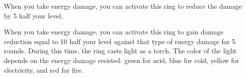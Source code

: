 \begin{comment}
\begin{dtable}
    \lcaption{Rings}
    \begin{dtabularx}{\columnwidth}{>{\lcol}X l}
        Ring & Market Price \\
        \hline
        Protection \plus1 & 2,000 gp \\
        Feather falling & 2,200 gp \\
        Climbing & 2,500 gp \\
        Jumping & 2,500 gp \\
        Sustenance & 2,500 gp \\
        Swimming & 2,500 gp \\
        Mind shielding & 8,000 gp \\
        Protection \plus2 & 8,000 gp \\
        Climbing, improved & 10,000 gp \\
        Jumping, improved & 10,000 gp \\
        Swimming, improved & 10,000 gp \\
        Energy resistance, minor & 12,000 gp \\
        Protection \plus3 & 18,000 gp \\
        Energy resistance, major & 28,000 gp \\
        Protection \plus4 & 32,000 gp \\
        Energy resistance, greater & 44,000 gp \\
        Protection \plus5 & 50,000 gp \\
    \end{dtabularx}
\end{dtable}
\end{comment}

 When you take energy damage, you can activate this ring to reduce the damage by 5 \add half your level.


 When you take energy damage, you can activate this ring to gain damage reduction equal to 10 \add half your level against that type of energy damage for 5 rounds.
During this time, the ring casts light as a torch.
The color of the light depends on the energy damage resisted: green for acid, blue for cold, yellow for electricity, and red for fire.

